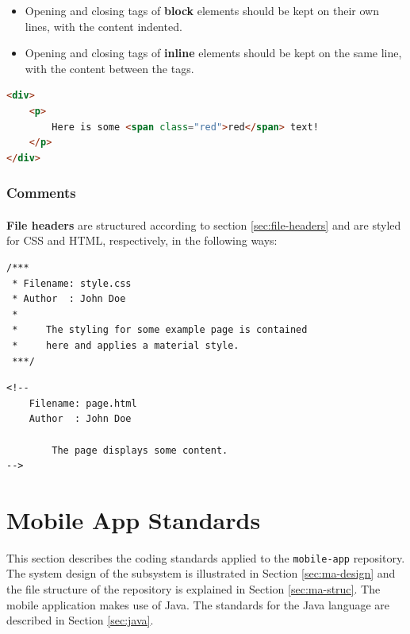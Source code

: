 \documentclass{article}
\begin{document}
    \begin{itemize}
        \item Opening and closing tags of \textbf{block} elements should be kept
            on their own lines, with the content indented.
        \item Opening and closing tags of \textbf{inline} elements should be
            kept on the same line, with the content between the tags.
    \end{itemize}

    \begin{lstlisting}[language=html]
<div>
    <p>
        Here is some <span class="red">red</span> text!
    </p>
</div>
    \end{lstlisting}

    \subsubsection{Comments}
    \label{sec:ls-html-com}

    \paragraph{}
    \textbf{File headers} are structured according to section
    \ref{sec:file-headers} and are styled for CSS and HTML, respectively, in the
    following ways:

    \begin{lstlisting}
/***
 * Filename: style.css
 * Author  : John Doe
 *
 *     The styling for some example page is contained
 *     here and applies a material style.
 ***/
    \end{lstlisting}

    \begin{lstlisting}
<!--
    Filename: page.html
    Author  : John Doe
    
        The page displays some content.
-->
    \end{lstlisting}

    \newpage
    

    \section{Mobile App Standards}
    \label{sec:mobile-app}

    This section describes the coding standards applied to the
    \texttt{mobile-app} repository. The system design of the subsystem is
    illustrated in Section \ref{sec:ma-design} and the file structure of the
    repository is explained in Section \ref{sec:ma-struc}. The mobile
    application makes use of Java. The standards for the Java language are
    described in Section \ref{sec:java}.
\end{document}
